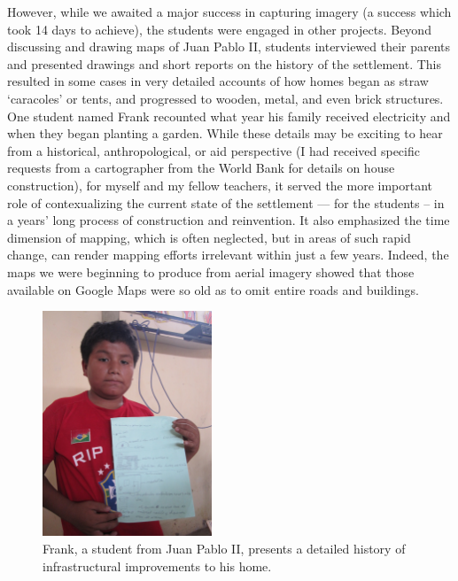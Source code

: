 \documentclass[11pt,oneside,notitlepage]{report}
\begin{document}
However, while we awaited a major success in capturing imagery (a success which took 14 days to achieve), the students were engaged in other projects. Beyond discussing and drawing maps of Juan Pablo II, students interviewed their parents and presented drawings and short reports on the history of the settlement. This resulted in some cases in very detailed accounts of how homes began as straw `caracoles' or tents, and progressed to wooden, metal, and even brick structures. One student named Frank recounted what year his family received electricity and when they began planting a garden. While these details may be exciting to hear from a historical, anthropological, or aid perspective (I had received specific requests from a cartographer from the World Bank for details on house construction), for myself and my fellow teachers, it served the more important role of contexualizing the current state of the settlement --- for the students -- in a years' long process of construction and reinvention. It also emphasized the time dimension of mapping, which is often neglected, but in areas of such rapid change, can render mapping efforts irrelevant within just a few years. Indeed, the maps we were beginning to produce from aerial imagery showed that those available on Google Maps were so old as to omit entire roads and buildings.

\begin{figure}
	\begin{flushright}
		\includegraphics[width=0.45\textwidth]{images/juan-pablo-frank.jpg}
		\caption{Frank, a student from Juan Pablo II, presents a detailed history of infrastructural improvements to his home.}
	\end{flushright}
\end{figure}
\end{document}

